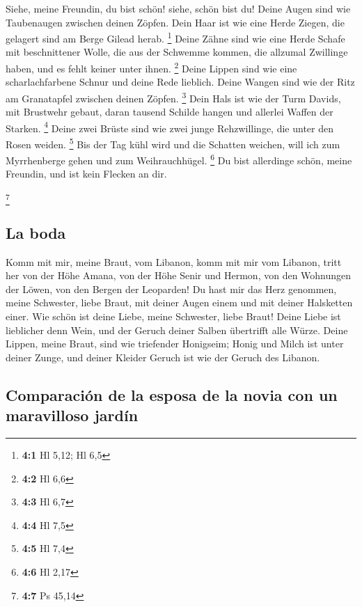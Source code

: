  Siehe, meine Freundin, du bist schön! siehe, schön bist
du! Deine Augen sind wie Taubenaugen zwischen deinen Zöpfen. Dein Haar
ist wie eine Herde Ziegen, die gelagert sind am Berge Gilead herab.
\footnote{\textbf{4:1} Hl 5,12; Hl 6,5}  Deine Zähne sind
wie eine Herde Schafe mit beschnittener Wolle, die aus der Schwemme
kommen, die allzumal Zwillinge haben, und es fehlt keiner unter ihnen.
\footnote{\textbf{4:2} Hl 6,6}  Deine Lippen sind wie eine
scharlachfarbene Schnur und deine Rede lieblich. Deine Wangen sind wie
der Ritz am Granatapfel zwischen deinen Zöpfen. \footnote{\textbf{4:3}
  Hl 6,7}  Dein Hals ist wie der Turm Davids, mit
Brustwehr gebaut, daran tausend Schilde hangen und allerlei Waffen der
Starken. \footnote{\textbf{4:4} Hl 7,5}  Deine zwei Brüste
sind wie zwei junge Rehzwillinge, die unter den Rosen weiden.
\footnote{\textbf{4:5} Hl 7,4}  Bis der Tag kühl wird und
die Schatten weichen, will ich zum Myrrhenberge gehen und zum
Weihrauchhügel. \footnote{\textbf{4:6} Hl 2,17}  Du bist
allerdinge schön, meine Freundin, und ist kein Flecken an dir.

\footnote{\textbf{4:7} Ps 45,14}

\hypertarget{la-boda}{%
\subsection{La boda}\label{la-boda}}

 Komm mit mir, meine Braut, vom Libanon, komm mit mir vom
Libanon, tritt her von der Höhe Amana, von der Höhe Senir und Hermon,
von den Wohnungen der Löwen, von den Bergen der Leoparden!
 Du hast mir das Herz genommen, meine Schwester, liebe
Braut, mit deiner Augen einem und mit deiner Halsketten einer.
 Wie schön ist deine Liebe, meine Schwester, liebe Braut!
Deine Liebe ist lieblicher denn Wein, und der Geruch deiner Salben
übertrifft alle Würze.  Deine Lippen, meine Braut, sind
wie triefender Honigseim; Honig und Milch ist unter deiner Zunge, und
deiner Kleider Geruch ist wie der Geruch des Libanon.

\hypertarget{comparaciuxf3n-de-la-esposa-de-la-novia-con-un-maravilloso-jarduxedn}{%
\subsection{Comparación de la esposa de la novia con un maravilloso
jardín}\label{comparaciuxf3n-de-la-esposa-de-la-novia-con-un-maravilloso-jarduxedn}}

